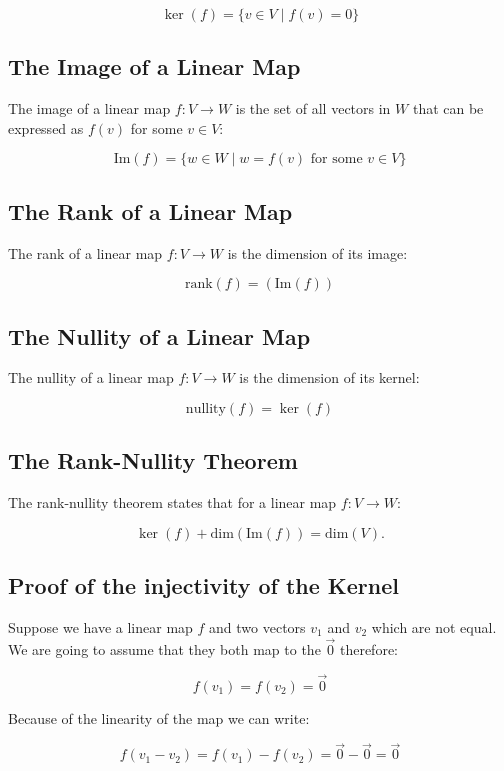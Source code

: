 \[
    \ker(f) = \{ v \in V \mid f(v) = 0 \}
\]

\subsection{The Image of a Linear Map}

The image of a linear map \( f: V \to W \) is the set of all vectors in \( W \) that can be expressed 
as \( f(v) \) for some \( v \in V \):

\[
    \text{Im}(f) = \{ w \in W \mid w = f(v) \text{ for some } v \in V \}
\]
 
\subsection{The Rank of a Linear Map}

The rank of a linear map \( f: V \to W \) is the dimension of its image:

\[
    \text{rank}(f) = (\text{Im}(f))
\]

\subsection{The Nullity of a Linear Map}

The nullity of a linear map \( f: V \to W \) is the dimension of its kernel:
    
\[
    \text{nullity}(f) = \ker(f)
\]

\subsection{The Rank-Nullity Theorem}

The rank-nullity theorem states that for a linear map \( f: V \to W \):

\[
    \ker(f) + \text{dim}(\text{Im}(f)) = \text{dim}(V).
\]

\subsection{Proof of the injectivity of the Kernel}

Suppose we have a linear map \(f\) and two vectors \(v_1\) and \(v_2\) which are not equal. 
We are going to assume that they both map to the \(\vec{0}\) therefore:

\[
    f(v_1) = f(v_2) = \vec{0}
\]

Because of the linearity of the map we can write:

\[
    f(v_1 - v_2) = f(v_1) - f(v_2) = \vec{0} - \vec{0} = \vec{0}
\]

